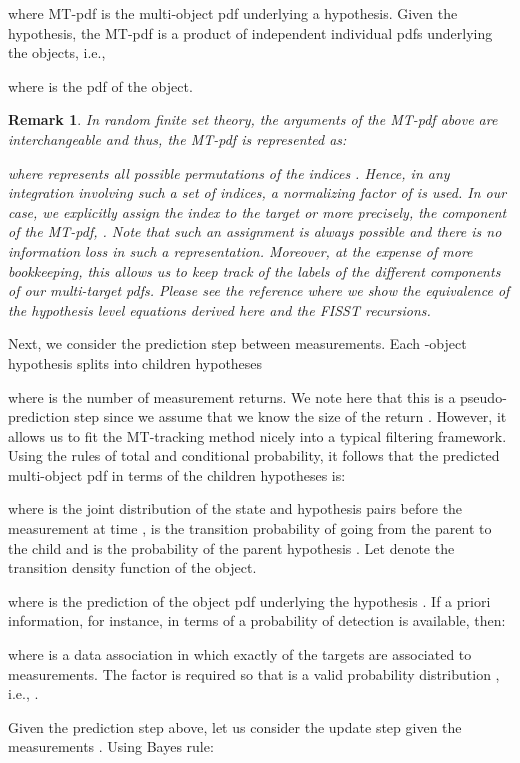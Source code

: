 \documentclass[10pt, conference]{IEEEtran}
\newtheorem{remark}{Remark}
\begin{document}
where MT-pdf is the multi-object pdf underlying a hypothesis. Given the hypothesis, the MT-pdf is a product of independent individual pdfs underlying the objects, i.e.,

where  is the pdf of the  object.
\begin{remark}
In random finite set theory, the arguments of the MT-pdf  above are interchangeable and thus, the MT-pdf is represented as:

where  represents all possible permutations of the indices . Hence, in any integration involving such a set of indices, a normalizing factor of  is used. In our case, we explicitly assign the index  to the target  or more precisely, the  component of the MT-pdf, . Note that such an assignment is always possible and there is no information loss in such a representation. Moreover, at the expense of  more bookkeeping, this allows us to keep track of the labels of the different components of our multi-target pdfs. Please see the reference \cite{HFISST_journal} where we show the equivalence of the hypothesis level equations derived here and the FISST recursions.
\end{remark} 

Next, we consider the prediction step between measurements. Each -object hypothesis  splits into  children hypotheses

where  is the number of measurement returns. We note here that this is a pseudo-prediction step since we assume that we know the size of the return . However, it allows us to fit the MT-tracking method nicely into a typical filtering framework.
Using the rules of total and conditional probability, it follows that the predicted multi-object pdf in terms of the children hypotheses is:

where  is the joint distribution of the state and hypothesis pairs before the measurement at time ,  is the transition probability of going from the parent  to the child  and  is the probability of the parent hypothesis .  Let  denote the transition density function of the  object. 

where  is the prediction of the  object pdf underlying the hypothesis . 
If a priori information, for instance, in terms of a probability of detection  is available, then:

where  is a data association in which exactly  of the  targets are associated to measurements. The  factor is required so that  is a valid probability distribution , i.e., . 


Given the prediction step above, let us consider the update step given the measurements . 
Using Bayes rule:
\end{document}
